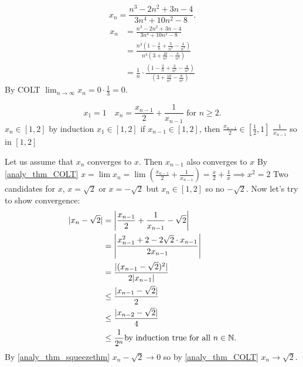 \documentclass[10pt, a4paper]{article}
\begin{document}
\begin{example}
    \[
    x_n = \frac{n ^ 3 - 2n ^ 2 + 3n - 4}{3n ^ 4 + 10n ^ 2 - 8}.
    \]
    \begin{align*}
        x_n &= \frac{n ^ 3 - 2n ^ 2 + 3n - 4}{3n ^ 4 + 10n ^ 2 - 8} \\
        &= \frac{n ^ 3 \left(1 - \frac{2}{n} + \frac{3}{n ^ 2} - \frac{4}{n ^ 3}\right)}{n ^ 4 \left(3 + \frac{10}{n ^ 2} - \frac{8}{n ^ 4} \right)} \\
        &= \frac{1}{n} \cdot \frac{\left(1 - \frac{2}{n} + \frac{3}{n ^ 2} - \frac{4}{n ^ 3}\right)}{\left(3 + \frac{10}{n ^ 2} - \frac{8}{n ^ 4} \right)}
    \end{align*}
    By COLT $\lim_{n \rightarrow \infty}x_n = 0 \cdot \frac{1}{3} = 0$.
\end{example}

\begin{example}
    \[
    x_1 = 1\quad x_n = \frac{x_{n - 1}}{2} + \frac{1}{x_{n - 1}}\text{ for } n \geq 2.
    \]
    $x_n \in [1, 2]$ by induction $x_1 \in [1, 2]$
    if $x_{n - 1} \in [1, 2]$,
    then $\frac{x_{n - 1}}{2} \in \left[\frac{1}{2}, 1\right]$
    $\frac{1}{x_{n - 1}}$ so in $[1, 2]$

    Let us assume that $x_n$ converges to $x$.
    Then $x_{n - 1}$ also converges to $x$
    By \autoref{analy_thm_COLT} $x = \lim x_n = \lim \left(\frac{x_{n - 1}}{2} + \frac{1}{x_{n - 1}}\right) = \frac{x}{2} + \frac{1}{x} \implies x ^ 2 = 2$
    Two candidates for $x$,
    $x = \sqrt{2}$ or $x = -\sqrt{2}$ but $x_n \in [1, 2]$ so no $-\sqrt{2}$.
    Now let's try to show convergence:
    \begin{align*}
        |x_n - \sqrt{2}| &= \left|\frac{x_{n - 1}}{2} + \frac{1}{x_{n - 1}} - \sqrt{2}\right| \\
        &= \left|\frac{x_{n - 1} ^ 2 + 2 - 2\sqrt{2}\cdot x_{n - 1}}{2x_{n - 1}}\right| \\
        &= \frac{|(x_{n - 1} - \sqrt{2}) ^ 2|}{2|x_{n - 1}|} \\
        &\leq \frac{|x_{n - 1} - \sqrt{2}|}{2} \\
        &\leq \frac{|x_{n - 2} - \sqrt{2}|}{4} \\
        &\leq \frac{1}{2 ^ n} \text{by induction true for all } n \in \mathbb{N}.
    \end{align*}
    By \autoref{analy_thm_squeezethm} $x_n - \sqrt{2} \rightarrow 0$ so by \autoref{analy_thm_COLT}
    $x_n \rightarrow \sqrt{2}$.
\end{example}
\end{document}
